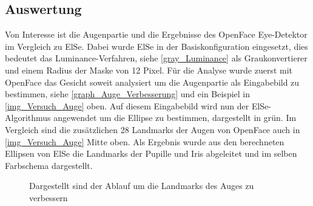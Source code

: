 \subsection{Auswertung}
Von Interesse ist die Augenpartie und die Ergebnisse des OpenFace Eye-Detektor im Vergleich zu ElSe. Dabei wurde ElSe in der Basiskonfiguration eingesetzt, dies bedeutet das Luminance-Verfahren, siehe \autoref{gray_Luminance} als Graukonvertierer und einem Radius der Maske von 12 Pixel.
Für die Analyse wurde zuerst mit OpenFace das Gesicht soweit analysiert um die Augenpartie als Eingabebild zu bestimmen, siehe \autoref{graph_Auge_Verbesserung} und ein Beispiel in \autoref{img_Versuch_Auge} oben. Auf diesem Eingabebild wird nun der ElSe-Algorithmus angewendet um die Ellipse zu bestimmen, dargestellt in grün. Im Vergleich sind die zusätzlichen 28 Landmarks der Augen von OpenFace auch in \autoref{img_Versuch_Auge} Mitte oben. Als Ergebnis wurde aus den berechneten Ellipsen von ElSe die Landmarks der Pupille und Iris abgeleitet und im selben Farbschema dargestellt.
\begin{figure}
	\centering
	
	\caption{Dargestellt sind der Ablauf um die Landmarks des Auges zu verbessern}
	\label{graph_Auge_Verbesserung}
\end{figure}

